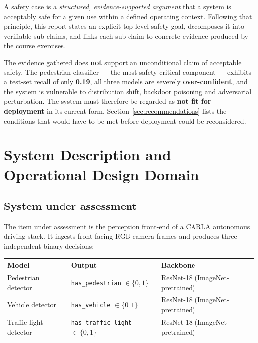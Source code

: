 \documentclass[11pt,a4paper]{article}
\begin{document}
A safety case is a \emph{structured, evidence-supported argument} that a system
is acceptably safe for a given use within a defined operating context. Following
that principle, this report states an explicit top-level safety goal, decomposes
it into verifiable sub-claims, and links each sub-claim to concrete evidence
produced by the course exercises.

\begin{tcolorbox}[colback=warnred!8,colframe=warnred,title=\bfseries Overall verdict]
The evidence gathered does \textbf{not} support an unconditional claim of
acceptable safety. The pedestrian classifier --- the most safety-critical
component --- exhibits a test-set recall of only \textbf{0.19}, all three
models are severely \textbf{over-confident}, and the system is vulnerable to
distribution shift, backdoor poisoning and adversarial perturbation. The system
must therefore be regarded as \textbf{not fit for deployment} in its current
form. Section~\ref{sec:recommendations} lists the conditions that would have to
be met before deployment could be reconsidered.
\end{tcolorbox}

\section{System Description and Operational Design Domain}
\subsection{System under assessment}
The item under assessment is the perception front-end of a CARLA autonomous
driving stack. It ingests front-facing RGB camera frames and produces three
independent binary decisions:

\begin{center}
\begin{tabular}{lll}
\toprule
\textbf{Model} & \textbf{Output} & \textbf{Backbone} \\
\midrule
Pedestrian detector    & \texttt{has\_pedestrian} $\in \{0,1\}$    & ResNet-18 (ImageNet-pretrained) \\
Vehicle detector       & \texttt{has\_vehicle} $\in \{0,1\}$       & ResNet-18 (ImageNet-pretrained) \\
Traffic-light detector & \texttt{has\_traffic\_light} $\in \{0,1\}$& ResNet-18 (ImageNet-pretrained) \\
\bottomrule
\end{tabular}
\end{center}
\end{document}
